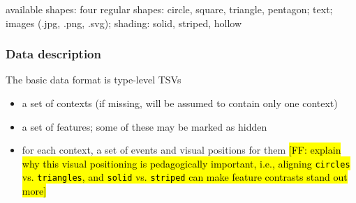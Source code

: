 \documentclass[11pt,letterpaper]{article}
\newcommand{\Note}[1]{}
\renewcommand{\Note}[1]{\hl{[#1]}}
\newcommand{\NoteSigned}[3]{{\sethlcolor{#2}\Note{#1: #3}}}
\newcommand{\NoteFF}[1]{\NoteSigned{FF}{LightBlue}{#1}}
\begin{document}
available shapes: four regular shapes: circle, square, triangle, pentagon; text; images (.jpg, .png, .svg);
shading: solid, striped, hollow

\subsubsection{Data description}
The basic data format is type-level TSVs

\begin{itemize}
\item a set of contexts (if missing, will be assumed to contain only one context)
\item a set of features; some of these may be marked as hidden
\item for each context, a set of events and visual positions for them \NoteFF{explain why this visual positioning is pedagogically important, i.e., aligning \texttt{circles} vs. \texttt{triangles}, and \texttt{solid} vs. \texttt{striped} can make feature contrasts stand out more}
\end{itemize}

%

\end{document}
